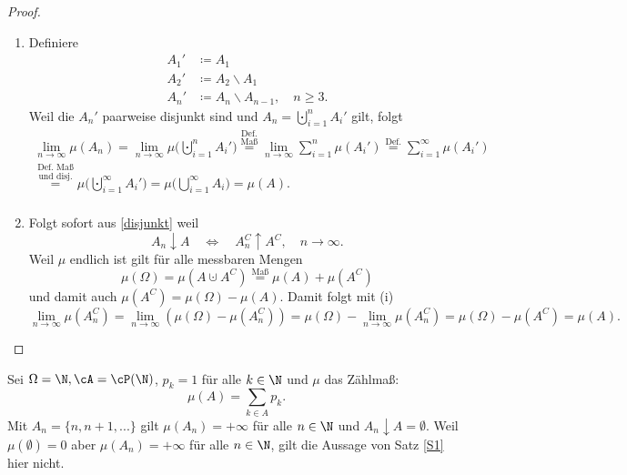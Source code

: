 \begin{proof}\abs
	\begin{enumerate}[label=(\roman*)]
		\item \label{disjunkt} Definiere
		\begin{align*}
		A_{1}' & \coloneqq  A_1\\
		A_{2}' & \coloneqq  A_2 \backslash A_1\\
		A_{n}' & \coloneqq  A_n \backslash A_{n-1},\quad n\geq 3.
		\end{align*}
		Weil die $A_n'$ paarweise disjunkt sind und $A_n=\bigcupdot\limits_{i=1}^{n} A_{i}'$ gilt, folgt
		\begin{gather*} 
		\lim\limits_{n \to \infty} \mu (A_n)  = \lim\limits_{n \to \infty} \mu \Big(\bigcupdot\limits_{i=1}^{n} A_{i}'\Big) \overset{\text{Def.}}{\overset{\text{Maß}}{=}} \lim\limits_{n \to \infty} \sum\limits_{i=1}^{n} \mu (A_{i}') \overset{\text{Def.}}{=} \sum\limits_{i=1}^{\infty} \mu (A_{i}')\\ \overset{\text{Def. Maß}}{\overset{\text{und disj.}}{=}} \mu \Big(\bigcupdot\limits_{i = 1}^{\infty}A_{i}'\Big) = \mu \Big(\bigcup\limits_{i = 1}^{\infty}A_{i}\Big) = \mu (A).\\
		\end{gather*}
		\item \label{Gegenbsp} Folgt sofort aus \ref{disjunkt} weil
		\[ A_n \downarrow A \quad \Leftrightarrow \quad A_{n}^{C} \uparrow A^C, \quad n\to\infty. \]
		Weil $\mu$ endlich ist gilt f\"ur alle messbaren Mengen 
		\[ \mu(\Omega) = \mu(A \cupdot A^C) \overset{\text{Maß}}{=} \mu (A) + \mu (A^C) \]
		und damit auch $\mu (A^C) = \mu (\Omega) - \mu (A)$. Damit folgt mit (i) \[ 
		\lim\limits_{n \to \infty} \mu(A_{n}^{C}) = \lim\limits_{n \to \infty} \left( \mu(\Omega) - \mu(A_n^{C})\right) = \mu(\Omega) - \lim\limits_{n \to \infty} \mu(A_n^C) = \mu(\Omega) - \mu (A^C) = \mu (A). \]
		
	\end{enumerate}
\end{proof}

\begin{beispiel}[Gegenbeispiel zu \ref{Gegenbsp} mit $\mu(\Omega) = \infty$]
	Sei $\Omega = \N, \cA = \cP(\N)$, $p_k = 1$ f\"ur alle $k\in\N$ und $\mu$ das Z\"ahlma\ss: \[ \mu (A) = \sum\limits_{k \in A} p_k. \] Mit $A_n=\{ n, n+1, ... \}$ gilt $\mu(A_n)=+\infty$ f\"ur alle $n\in\N$ und $A_n\downarrow A=\emptyset$. Weil $\mu(\emptyset)=0$ aber $\mu(A_n)=+\infty$ f\"ur alle $n\in\N$, gilt die Aussage von Satz \ref{S1} hier nicht.	
\end{beispiel}

